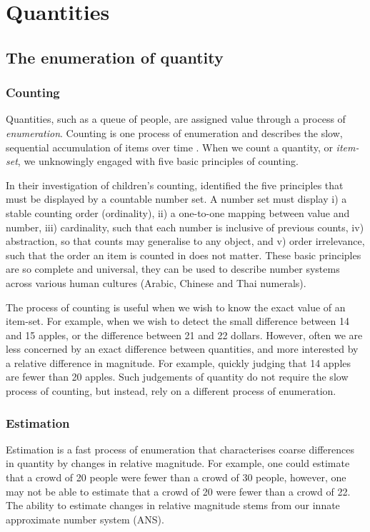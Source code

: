 \section{Quantities}
\subsection{The enumeration of quantity}
\subsubsection{Counting}
Quantities, such as a queue of people, are assigned value through a process of \textit{enumeration}. Counting is one process of enumeration and describes the slow, sequential accumulation of items over time \cite{dehaene2011NumSense}. When we count a quantity, or \textit{item-set}, we unknowingly engaged with five basic principles of counting. 

In their investigation of children's counting,  identified the five principles that must be displayed by a countable number set. A number set must display i) a stable counting order (ordinality), ii) a one-to-one mapping between value and number, iii) cardinality, such that each number is inclusive of previous counts, iv) abstraction, so that counts may generalise to any object, and v) order irrelevance, such that the order an item is counted in does not matter. These basic principles are so complete and universal, they can be used to describe number systems across various human cultures (\eg Arabic, Chinese and Thai numerals).

The process of counting is useful when we wish to know the exact value of an item-set. For example, when we wish to detect the small difference between 14 and 15 apples, or the difference between 21 and 22 dollars. However, often we are less concerned by an exact difference between quantities, and more interested by a relative difference in magnitude. For example, quickly judging that 14 apples are fewer than 20 apples. Such judgements of quantity do not require the slow process of counting, but instead, rely on a different process of enumeration.


\subsubsection{Estimation}
Estimation is a fast process of enumeration that characterises coarse differences in quantity by changes in relative magnitude. For example, one could estimate that a crowd of 20 people were fewer than a crowd of 30 people, however, one may not be able to estimate that a crowd of 20 were fewer than a crowd of 22. The ability to estimate changes in relative magnitude stems from our innate approximate number system (ANS). %

